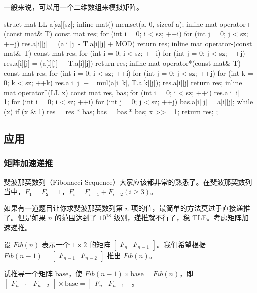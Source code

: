 一般来说，可以用一个二维数组来模拟矩阵。

\begin{cppcode}
struct mat {
  LL a[sz][sz];
  inline mat() { memset(a, 0, sizeof a); }
  inline mat operator+(const mat& T) const {
    mat res;
    for (int i = 0; i < sz; ++i)
      for (int j = 0; j < sz; ++j)
        res.a[i][j] = (a[i][j] - T.a[i][j] + MOD) %
    return res;
  }
  inline mat operator-(const mat& T) const {
    mat res;
    for (int i = 0; i < sz; ++i)
      for (int j = 0; j < sz; ++j) res.a[i][j] = (a[i][j] + T.a[i][j]) %
    return res;
  }
  inline mat operator*(const mat& T) const {
    mat res;
    for (int i = 0; i < sz; ++i)
      for (int j = 0; j < sz; ++j)
        for (int k = 0; k < sz; ++k) {
          res.a[i][j] += mul(a[i][k], T.a[k][j]);
          res.a[i][j] %
        }
    return res;
  }
  inline mat operator^(LL x) const {
    mat res, bas;
    for (int i = 0; i < sz; ++i) res.a[i][i] = 1;
    for (int i = 0; i < sz; ++i)
      for (int j = 0; j < sz; ++j) bas.a[i][j] = a[i][j];
    while (x) {
      if (x & 1) res = res * bas;
      bas = bas * bas;
      x >>= 1;
    }
    return res;
  }
};
\end{cppcode}

\subsection{应用}

\subsubsection{矩阵加速递推}

斐波那契数列（Fibonacci Sequence）大家应该都非常的熟悉了。在斐波那契数列当中，$F_1 = F_2 = 1$，$F_i = F_{i - 1} + F_{i - 2}(i \geq 3)$。

如果有一道题目让你求斐波那契数列第 $n$ 项的值，最简单的方法莫过于直接递推了。但是如果 $n$ 的范围达到了 $10^{18}$ 级别，递推就不行了，稳 TLE。考虑矩阵加速递推。

设 $Fib(n)$ 表示一个 $1 \times 2$ 的矩阵 $\left[ \begin{array}{ccc}F_n & F_{n-1} \end{array}\right]$。我们希望根据 $Fib(n-1)=\left[ \begin{array}{ccc}F_{n-1} & F_{n-2} \end{array}\right]$ 推出 $Fib(n)$。

试推导一个矩阵 $\text{base}$，使 $Fib(n-1) \times \text{base} = Fib(n)$，即 $\left[\begin{array}{ccc}F_{n-1} & F_{n-2}\end{array}\right] \times \text{base} = \left[ \begin{array}{ccc}F_n & F_{n-1} \end{array}\right]$。


